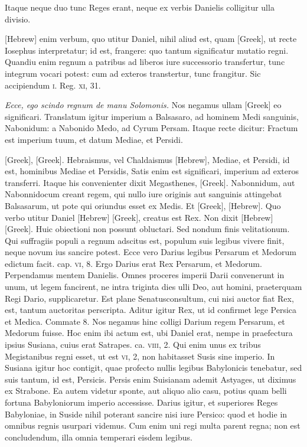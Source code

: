 \begin{parnumbers}
{}
\lnr{}Itaque neque
duo tunc Reges erant, neque ex verbis Danielis colligitur ulla divisio.

\texthebrew{[Hebrew]} enim verbum, quo utitur Daniel, nihil aliud est, quam
\textgreek{[Greek]}, ut recte Iosephus interpretatur;
 id est, frangere: quo tantum
significatur mutatio regni.
\lnr{}Quandiu enim regnum a patribus
ad liberos iure successorio transfertur, tunc integrum vocari potest:
cum ad exteros transtertur, tunc frangitur.
\lnr{}Sic accipiendum \textsc{i}.
\lnr{}Reg. \textsc{xi}, 31.

\textit{Ecce, ego scindo regnum  de manu Solomonis.}
\lnr{}Nos negamus ullam \textgreek{[Greek]} eo significari.
\lnr{}Translatum igitur imperium
a Balsasaro, ad hominem Medi sanguinis, Nabonidum: a Nabonido
Medo, ad Cyrum Persam.
\lnr{}Itaque recte dicitur: Fractum est
imperium tuum, et datum Mediae, et Persidi.

\textgreek{[Greek]},
\textgreek{[Greek]}.
\lnr{}Hebraismus, vel Chaldaismus
\texthebrew{[Hebrew]}, Mediae, et Persidi, id est, hominibus Mediae et Persidis,
Satis enim est significari, imperium ad exteros transferri.
\lnr{}Itaque his convenienter
dixit Megasthenes, \textgreek{[Greek]}.
\lnr{}Nabonnidum, aut Nabonnidocum creant regem, qui
nullo iure originis aut sanguinis attingebat Balsasarum, ut pote qui
oriundus esset ex Medis.
\lnr{}Et \textgreek{[Greek]}, \texthebrew{[Hebrew]}.
\lnr{}Quo verbo utitur
Daniel \texthebrew{[Hebrew]} \textgreek{[Greek]}, creatus est Rex.
\lnr{}Non dixit \texthebrew{[Hebrew]} \textgreek{[Greek]}.
\lnr{}Huic obiectioni non possunt obluctari.
\lnr{}Sed nondum
finis velitationum.
\lnr{}Qui suffragiis populi a regnum adscitus est,
populum suis legibus vivere finit, neque novum ius sancire potest.
\lnr{}Ecce vero Darius legibus Persarum et Medorum edictum facit.
\lnr{}cap. \textsc{vi}, 8.
\lnr{}Ergo Darius erat Rex Persarum, et Medorum.
\lnr{}Perpendamus
mentem Danielis.
\lnr{}Omnes proceres imperii Darii convenerunt
in unum, ut legem fancirent, ne intra triginta dies ulli
Deo, aut homini, praeterquam Regi Dario, supplicaretur.
\lnr{}Est plane
Senatusconsultum, cui nisi auctor fiat Rex, est, tantum auctoritas
perscripta.
\lnr{}Aditur igitur Rex, ut id confirmet lege Persica et
Medica.
\lnr{}Commate 8.
\lnr{}Nos negamus hinc colligi Darium regem
Persarum, et Medorum fuisse.
\lnr{}Hoc enim ibi actum est, ubi Daniel
erat, nempe in praefectura ipsius Susiana, cuius erat Satrapes.
\lnr{}ca. \textsc{viii}, 2.
\lnr{}Qui enim unus ex tribus Megistanibus regni esset, ut est
\textsc{vi}, 2, non habitasset Susis sine imperio.
\lnr{}In Susiana igitur hoc contigit,
quae profecto nullis legibus Babylonicis tenebatur, sed suis
tantum, id est, Persicis.
\lnr{}Persis enim Suisianam ademit Astyages, ut
diximus ex Strabone.
\lnr{}Ea autem videtur sponte, aut aliquo alio casu,
potius quam belli fortuna Babyloniorum imperio accessisse.
\lnr{}Darius igitur, et superiores Reges Babyloniae, in Suside nihil poterant
sancire nisi iure Persico: quod et hodie in omnibus regnis usurpari
videmus.
\lnr{}Cum enim uni regi multa parent regna; non est concludendum,
illa omnia temperari eisdem legibus.


\end{parnumbers}

